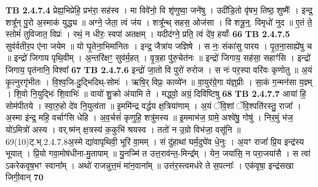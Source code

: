 \documentclass[17pt]{extarticle}
\begin{document}
                  \newline
                                \textbf{ TB 2.4.7.4} \newline
                  प्रेह्य॒भिप्रेहि॒ प्रभ॑रा॒ सह॑स्व । मा विवे॑नो॒ वि शृ॑णुष्वा॒ जने॑षु । उदी॑डि॒तो वृ॑षभ॒ तिष्ठ॒ शुष्मैः᳚ । इन्द्र॒ शत्रू᳚न् पु॒रो अ॒स्माक॑ युद्ध्य ॥ अग्ने॒ जेता॒ त्वं ज॑य । शत्रू᳚न्थ् सहस॒ ओज॑सा । वि शत्रू॒न्॒. विमृधो॑ नुद ॥ ए॒तं ते॒ स्तोमं॑ तुविजात॒ विप्रः॑ । रथं॒ न धीरः॒ स्वपा॑ अतक्षम् । यदीद॑ग्ने॒ प्रति॒ त्वं दे॑व॒ हर्याः᳚ \textbf{ 66} \newline
                  \newline
                                \textbf{ TB 2.4.7.5} \newline
                  सुव॑र्वतीर॒प ए॑ना जयेम ॥ यो घृ॒तेना॒भिमा॑नितः । इन्द्र॒ जैत्रा॑य जज्ञिषे । स नः॒ संका॑सु पारय । पृ॒त॒ना॒साह्ये॑षु च ॥ इन्द्रो॑ जिगाय पृथि॒वीम् । अ॒न्तरि॑क्षꣳ॒॒ सुव॑र्म॒हत् । वृ॒त्र॒हा पु॑रु॒चेत॑नः ॥ इन्द्रो॑ जिगाय॒ सह॑सा॒ सहाꣳ॑सि । इन्द्रो॑ जिगाय॒ पृत॑नानि॒ विश्वा᳚ \textbf{ 67} \newline
                  \newline
                                \textbf{ TB 2.4.7.6} \newline
                  इन्द्रो॑ जा॒तो वि पुरो॑ रुरोज । स नः॑ पर॒स्पा वरि॑वः कृणोतु ॥ अ॒यं कृ॒त्नुरगृ॑भीतः । वि॒श्व॒जि-दु॒द्भिदिथ्-सोमः॑ । ऋषि॒र् विप्रः॒ काव्ये॑न ॥ वा॒युर॑ग्रे॒गा य॑ज्ञ्॒प्रीः । सा॒कं ग॒न्मन॑सा य॒ज्ञ्म् । शि॒वो नि॒युद्भिः॑ शि॒वाभिः॑ ॥ वायो॑ शु॒क्रो अ॑यामि ते । मद्ध्वो॒ अग्रं॒ दिवि॑ष्टिषु \textbf{ 68} \newline
                  \newline
                                \textbf{ TB 2.4.7.7} \newline
                  आया॑ हि॒ सोम॑पीतये । स्वा॒रु॒हो दे॑व नि॒युत्व॑ता ॥ इ॒ममि॑न्द्र वर्द्धय क्ष॒त्रिया॑णाम् । अ॒यं ॅवि॒शां ॅवि॒श्पति॑रस्तु॒ राजा᳚ । अ॒स्मा इ॑न्द्र॒ महि॒ वर्चाꣳ॑सि धेहि । अ॒व॒र्चसं॑ कृणुहि॒ शत्रु॑मस्य ॥ इ॒ममाभ॑ज॒ ग्रामे॒ अश्वे॑षु॒ गोषु॑ । निर॒मुं भ॑ज॒ यो॑ऽमित्रो॑ अस्य । वर्.ष्म॑न् क्ष॒त्रस्य॑ क॒कुभि॑ श्रयस्व । ततो॑ न उ॒ग्रो विभ॑जा॒ वसू॑नि ॥ 69(10)ट्.भ्.2.4.7.8अ॒स्मे द्या॑वापृथिवी॒ भूरि॑ वा॒मम् । सं दु॑हाथां घर्म॒दुघे॑व धे॒नुः । अ॒यꣳ राजा᳚ प्रि॒य इन्द्र॑स्य भूयात् । प्रि॒यो गवा॒मोष॑धीना-मु॒तापाम् ॥ यु॒नज्मि॑ त उत्त॒राव॑न्त॒-मिन्द्र᳚म् । येन॒ जया॑सि॒ न परा॒जया॑सै । स त्वा॑ ऽकरेकवृष॒भꣳ स्वाना᳚म् । अथो॑ राजन्नुत्त॒मं मा॑न॒वाना᳚म् ॥ उत्त॑र॒स्त्वमध॑रे ते स॒पत्नाः᳚ । एक॑वृषा॒ इन्द्र॑सखा जिगी॒वान् \textbf{ 70} \newline
                  \newline
\end{document}
